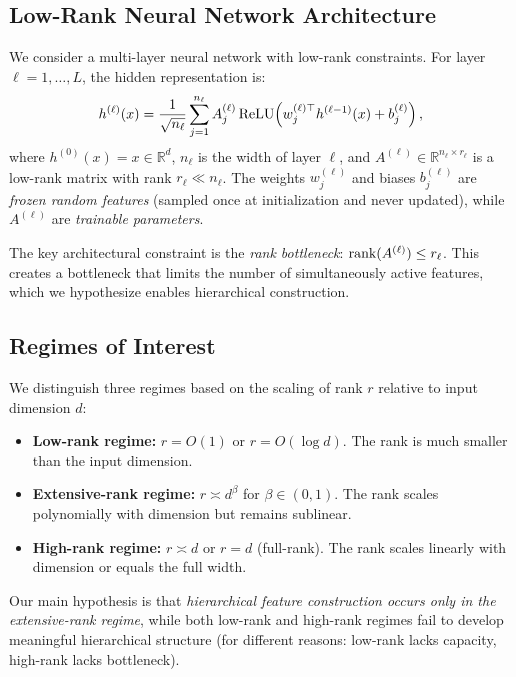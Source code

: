 \subsection{Low-Rank Neural Network Architecture}

We consider a multi-layer neural network with low-rank constraints. For layer $\ell = 1, \ldots, L$, the hidden representation is:
\begin{equation}
\label{eq:lowrank-layer}
h^{(\ell)}(x) = \frac{1}{\sqrt{n_\ell}} \sum_{j=1}^{n_\ell} A^{(\ell)}_j \,\text{ReLU}\!\left(w^{(\ell)\top}_j h^{(\ell-1)}(x) + b^{(\ell)}_j\right),
\end{equation}
where $h^{(0)}(x) = x \in \mathbb{R}^d$, $n_\ell$ is the width of layer $\ell$, and $A^{(\ell)} \in \mathbb{R}^{n_\ell \times r_\ell}$ is a low-rank matrix with rank $r_\ell \ll n_\ell$. The weights $w^{(\ell)}_j$ and biases $b^{(\ell)}_j$ are \emph{frozen random features} (sampled once at initialization and never updated), while $A^{(\ell)}$ are \emph{trainable parameters}.

The key architectural constraint is the \emph{rank bottleneck}: $\text{rank}(A^{(\ell)}) \le r_\ell$. This creates a bottleneck that limits the number of simultaneously active features, which we hypothesize enables hierarchical construction.

\subsection{Regimes of Interest}

We distinguish three regimes based on the scaling of rank $r$ relative to input dimension $d$:

\begin{definition}
\label{def:rank-regimes}
\begin{itemize}
    \item \textbf{Low-rank regime:} $r = O(1)$ or $r = O(\log d)$. The rank is much smaller than the input dimension.
    \item \textbf{Extensive-rank regime:} $r \asymp d^\beta$ for $\beta \in (0,1)$. The rank scales polynomially with dimension but remains sublinear.
    \item \textbf{High-rank regime:} $r \asymp d$ or $r = d$ (full-rank). The rank scales linearly with dimension or equals the full width.
\end{itemize}
\end{definition}

Our main hypothesis is that \emph{hierarchical feature construction occurs only in the extensive-rank regime}, while both low-rank and high-rank regimes fail to develop meaningful hierarchical structure (for different reasons: low-rank lacks capacity, high-rank lacks bottleneck).

